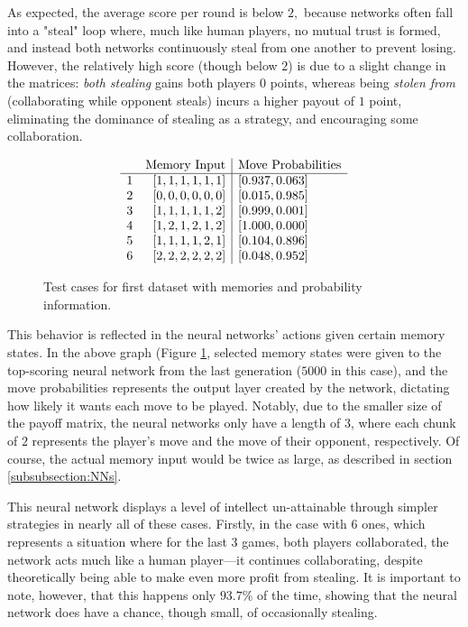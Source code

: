 \documentclass{article}
\begin{document}
As expected, the average score per round is below $2,$ because networks often fall into a "steal" loop where, much like human players, no mutual trust is formed, and instead both networks continuously steal from one another to prevent losing. However, the relatively high score (though below $2$) is due to a slight change in the matrices: \textit{both stealing} gains both players $0$ points, whereas being \textit{stolen from} (collaborating while opponent steals) incurs a higher payout of $1$ point, eliminating the dominance of stealing as a strategy, and encouraging some collaboration.

\begin{figure}[h]
	\[\begin{array}{l r|l}
		&\text{Memory Input} & \text{Move Probabilities} \\
		\hline
		1&{[1, 1, 1, 1, 1, 1]} & {[0.937, 0.063]} \\
		2&{[0, 0, 0, 0, 0, 0]} & {[0.015, 0.985]} \\
		3&{[1, 1, 1, 1, 1, 2]} & {[0.999, 0.001]} \\
		4&{[1, 2, 1, 2, 1, 2]} & {[1.000, 0.000]} \\
		5&{[1, 1, 1, 1, 2, 1]} & {[0.104, 0.896]} \\
		6&{[2, 2, 2, 2, 2, 2]} & {[0.048, 0.952]} \\
	\end{array}\]
  \caption{Test cases for first dataset with memories and probability information.}
  \label{fig:1607068848885-cases}
\end{figure}

This behavior is reflected in the neural networks' actions given certain memory states. In the above graph (Figure \ref{fig:1607068848885-cases}, selected memory states were given to the top-scoring neural network from the last generation ($5000$ in this case), and the move probabilities represents the output layer created by the network, dictating how  likely it wants each move to be played. Notably, due to the smaller size of the payoff matrix, the neural networks only have a length of $3$, where each chunk of $2$ represents the player's move and the move of their opponent, respectively. Of course, the actual memory input would be twice as large, as described in section \ref{subsubsection:NNs}.

This neural network displays a level of intellect un-attainable through simpler strategies in nearly all of these cases. Firstly, in the case with $6$ ones, which represents a situation where for the last $3$ games, both players collaborated, the network acts much like a human player---it continues collaborating, despite theoretically being able to make even more profit from stealing. It is important to note, however, that this happens only $93.7\%$ of the time, showing that the neural network does have a chance, though small, of occasionally stealing.
\end{document}
